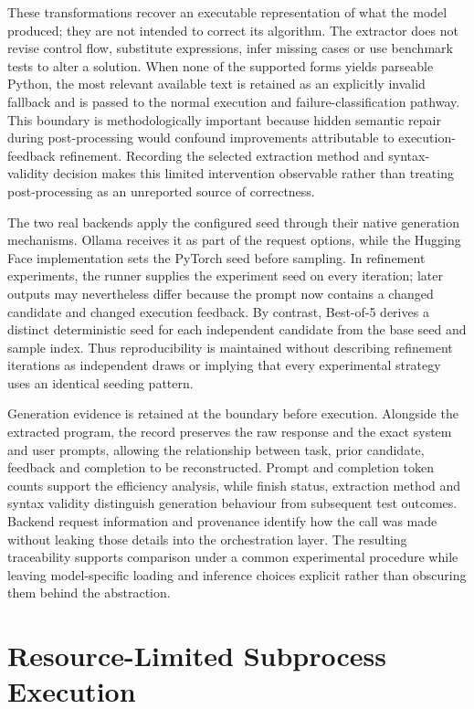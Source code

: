 These transformations recover an executable representation of what the model produced; they are not intended to correct its algorithm. The extractor does not revise control flow, substitute expressions, infer missing cases or use benchmark tests to alter a solution. When none of the supported forms yields parseable Python, the most relevant available text is retained as an explicitly invalid fallback and is passed to the normal execution and failure-classification pathway. This boundary is methodologically important because hidden semantic repair during post-processing would confound improvements attributable to execution-feedback refinement. Recording the selected extraction method and syntax-validity decision makes this limited intervention observable rather than treating post-processing as an unreported source of correctness.

The two real backends apply the configured seed through their native generation mechanisms. Ollama receives it as part of the request options, while the Hugging Face implementation sets the PyTorch seed before sampling. In refinement experiments, the runner supplies the experiment seed on every iteration; later outputs may nevertheless differ because the prompt now contains a changed candidate and changed execution feedback. By contrast, Best-of-5 derives a distinct deterministic seed for each independent candidate from the base seed and sample index. Thus reproducibility is maintained without describing refinement iterations as independent draws or implying that every experimental strategy uses an identical seeding pattern.

Generation evidence is retained at the boundary before execution. Alongside the extracted program, the record preserves the raw response and the exact system and user prompts, allowing the relationship between task, prior candidate, feedback and completion to be reconstructed. Prompt and completion token counts support the efficiency analysis, while finish status, extraction method and syntax validity distinguish generation behaviour from subsequent test outcomes. Backend request information and provenance identify how the call was made without leaking those details into the orchestration layer. The resulting traceability supports comparison under a common experimental procedure while leaving model-specific loading and inference choices explicit rather than obscuring them behind the abstraction.

\section{Resource-Limited Subprocess Execution}

